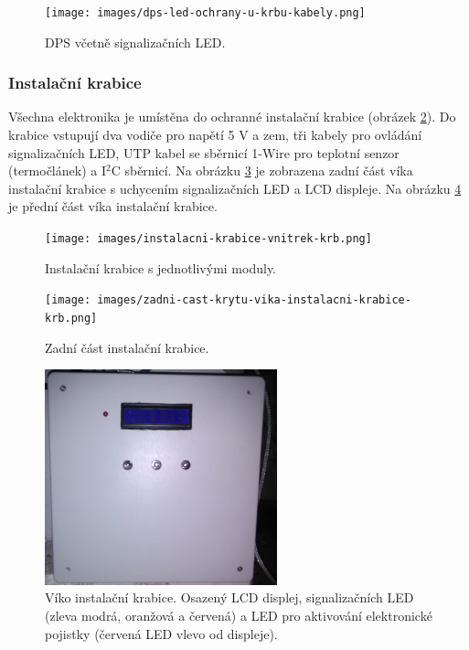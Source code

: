 \begin{figure}[H]
    \centering
    \texttt{[image: images/dps-led-ochrany-u-krbu-kabely.png]}
    \caption[DPS včetně signalizačních LED.]{DPS včetně signalizačních LED.}
    \label{fig:dps-led-ochrany-u-krbu-kabely}
\end{figure}

\subsubsection{Instalační krabice}
Všechna elektronika je umístěna do ochranné instalační krabice (obrázek \ref{fig:instalacni-krabice-vnitrek-krb}). Do krabice vstupují dva vodiče pro napětí 5 V a zem, tři kabely pro ovládání signalizačních LED, UTP kabel se sběrnicí 1-Wire pro teplotní senzor (termočlánek) a I$^2$C sběrnicí. Na obrázku \ref{fig:zadni-cast-krytu-vika-instalacni-krabice-krb} je zobrazena zadní část víka instalační krabice s uchycením signalizačních LED a LCD displeje. Na obrázku \ref{fig:predni-cast-krytu-vika-instalacni-krabice-krb} je přední část víka instalační krabice.

\begin{figure}[H]
    \centering
    \texttt{[image: images/instalacni-krabice-vnitrek-krb.png]}
    \caption[Instalační krabice s jednotlivými moduly.]{Instalační krabice s jednotlivými moduly.}
    \label{fig:instalacni-krabice-vnitrek-krb}
\end{figure}

\begin{figure}[H]
    \centering
    \texttt{[image: images/zadni-cast-krytu-vika-instalacni-krabice-krb.png]}
    \caption[Zadní část instalační krabice.]{Zadní část instalační krabice.}
    \label{fig:zadni-cast-krytu-vika-instalacni-krabice-krb}
\end{figure}

\begin{figure}[H]
    \centering
    \includegraphics[width=0.6\textwidth]{images/predni-cast-krytu-vika-instalacni-krabice-krb.png}
    \caption[Víko instalační krabice.]{Víko instalační krabice. Osazený LCD displej, signalizačních LED (zleva modrá, oranžová a červená) a LED pro aktivování elektronické pojistky (červená LED vlevo od displeje).}
    \label{fig:predni-cast-krytu-vika-instalacni-krabice-krb}
\end{figure}


